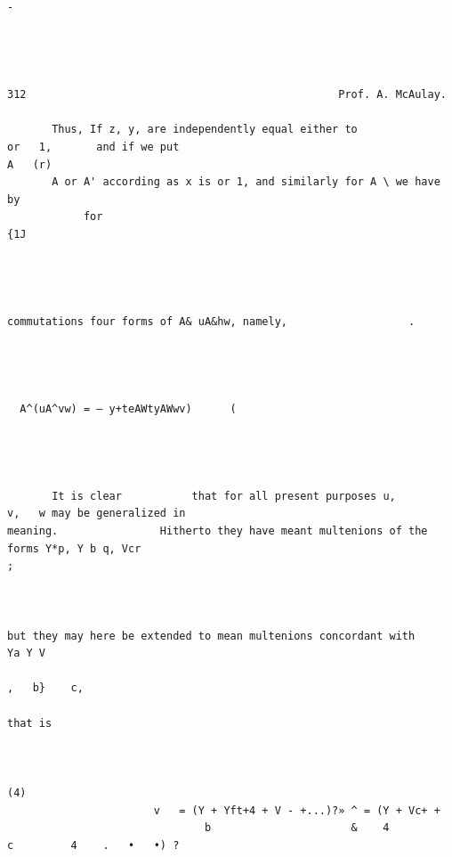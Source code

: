 \documentclass[10pt]{article}
\begin{document}
\begin{verbatim}

                                                                                            -




312                                                 Prof. A. McAulay.

       Thus, If z, y, are independently equal either to                                                           or   1,       and if we put
A   (r)
       A or A' according as x is or 1, and similarly for A \ we have by
            for                                                                                                                 {1J




commutations four forms of A& uA&hw, namely,                   .




  A^(uA^vw) = — y+teAWtyAWwv)      (




       It is clear           that for all present purposes u,                                           v,   w may be generalized in
meaning.                Hitherto they have meant multenions of the forms Y*p, Y b q, Vcr                                                              ;



but they may here be extended to mean multenions concordant with                                                                        Ya Y V
                                                                                                                                           ,   b}    c,

that is


                                                                                                                                                    (4)
                       v   = (Y + Yft+4 + V - +...)?» ^ = (Y + Vc+ +
                               b                      &    4                                            c         4    .   •   •) ?




\end{verbatim}
\end{document}
